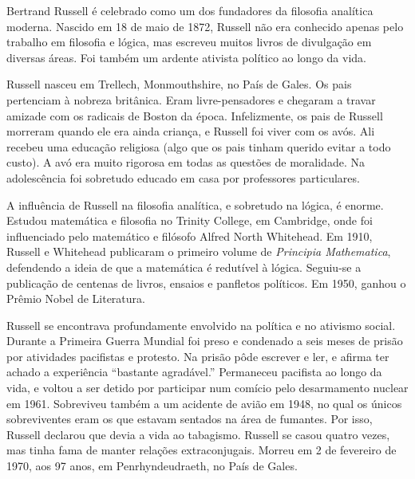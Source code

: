 \documentclass[../../../include/open-logic-section]{subfiles}
\begin{document}



Bertrand Russell é celebrado como um dos fundadores da filosofia
analítica moderna. Nascido em 18 de maio de 1872, Russell não era
conhecido apenas pelo trabalho em filosofia e lógica, mas escreveu
muitos livros de divulgação em diversas áreas. Foi também um ardente
ativista político ao longo da vida.

Russell nasceu em Trellech, Monmouthshire, no País de Gales. Os pais
pertenciam à nobreza britânica. Eram livre-pensadores e chegaram a
travar amizade com os radicais de Boston da época.  Infelizmente, os
pais de Russell morreram quando ele era ainda criança, e Russell foi
viver com os avós. Ali recebeu uma educação religiosa (algo que os
pais tinham querido evitar a todo custo). A avó era muito rigorosa
em todas as questões de moralidade. Na adolescência foi sobretudo
educado em casa por professores particulares.

A influência de Russell na filosofia analítica, e sobretudo na lógica,
é enorme. Estudou matemática e filosofia no Trinity College, em
Cambridge, onde foi influenciado pelo matemático e filósofo Alfred
North Whitehead.  Em 1910, Russell e Whitehead publicaram o primeiro
volume de \emph{Principia Mathematica}, defendendo a ideia de que a
matemática é redutível à lógica. Seguiu-se a publicação de centenas de
livros, ensaios e panfletos políticos. Em 1950, ganhou o Prêmio Nobel
de Literatura.

Russell se encontrava profundamente envolvido na política e no
ativismo social. Durante a Primeira Guerra Mundial foi preso e
condenado a seis meses de prisão por atividades pacifistas e
protesto. Na prisão pôde escrever e ler, e afirma ter achado a
experiência ``bastante agradável.'' Permaneceu pacifista ao longo da
vida, e voltou a ser detido por participar num comício pelo
desarmamento nuclear em 1961. Sobreviveu também a um acidente de avião
em 1948, no qual os únicos sobreviventes eram os que estavam sentados
na área de fumantes. Por isso, Russell declarou que devia a vida ao
tabagismo. Russell se casou quatro vezes, mas tinha fama de manter
relações extraconjugais.  Morreu em 2 de fevereiro de 1970, aos 97
anos, em Penrhyndeudraeth, no País de Gales.
\end{document}

